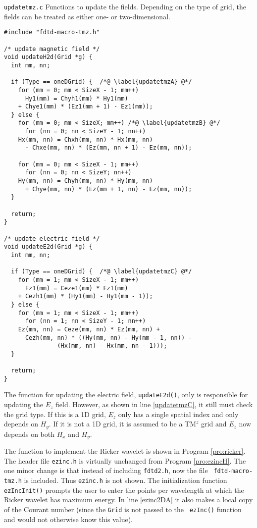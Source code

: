\begin{program}
{\tt updatetmz.c} Functions to update the fields.  Depending on the
type of grid, the fields can be treated as either one- or
two-dimensional.  
\label{pro:updatetmz}
\codemiddle
\begin{lstlisting}
#include "fdtd-macro-tmz.h"

/* update magnetic field */
void updateH2d(Grid *g) {
  int mm, nn;

  if (Type == oneDGrid) {  /*@ \label{updatetmzA} @*/
    for (mm = 0; mm < SizeX - 1; mm++)
      Hy1(mm) = Chyh1(mm) * Hy1(mm) 
	+ Chye1(mm) * (Ez1(mm + 1) - Ez1(mm));
  } else { 
    for (mm = 0; mm < SizeX; mm++) /*@ \label{updatetmzB} @*/
      for (nn = 0; nn < SizeY - 1; nn++)
	Hx(mm, nn) = Chxh(mm, nn) * Hx(mm, nn) 
	  - Chxe(mm, nn) * (Ez(mm, nn + 1) - Ez(mm, nn));

    for (mm = 0; mm < SizeX - 1; mm++)
      for (nn = 0; nn < SizeY; nn++)
	Hy(mm, nn) = Chyh(mm, nn) * Hy(mm, nn) 
	  + Chye(mm, nn) * (Ez(mm + 1, nn) - Ez(mm, nn));
  }

  return;
}

/* update electric field */
void updateE2d(Grid *g) {
  int mm, nn;

  if (Type == oneDGrid) {  /*@ \label{updatetmzC} @*/
    for (mm = 1; mm < SizeX - 1; mm++)
      Ez1(mm) = Ceze1(mm) * Ez1(mm) 
	+ Cezh1(mm) * (Hy1(mm) - Hy1(mm - 1));
  } else { 
    for (mm = 1; mm < SizeX - 1; mm++)
      for (nn = 1; nn < SizeY - 1; nn++)
	Ez(mm, nn) = Ceze(mm, nn) * Ez(mm, nn) +
	  Cezh(mm, nn) * ((Hy(mm, nn) - Hy(mm - 1, nn)) -
		       (Hx(mm, nn) - Hx(mm, nn - 1)));
  }

  return;
}
\end{lstlisting}
\end{program}

The function for updating the electric field, {\tt updateE2d()}, only
is responsible for updating the $E_z$ field.  However, as shown in
line \ref{updatetmzC}, it still must check the grid type.  If this is
a 1D grid, $E_z$ only has a single spatial index and only depends on
$H_y$.  If it is not a 1D grid, it is assumed to be a TM$^z$ grid and
$E_z$ now depends on both $H_x$ and $H_y$.

The function to implement the Ricker wavelet is shown in Program
\ref{pro:ricker}.  The header file {\tt ezinc.h} is virtually
unchanged from Program \ref{pro:ezincH}.  The one minor change is that
instead of including {\tt fdtd2.h}, now the file {\tt
  fdtd-macro-tmz.h} is included.  Thus {\tt ezinc.h} is not shown.
The initialization function {\tt ezIncInit()} prompts the user to
enter the points per wavelength at which the Ricker wavelet has
maximum energy.  In line \ref{ezinc2DA} it also makes a local copy of
the Courant number (since the {\tt Grid} is not passed to the {\tt
  ezInc()} function and would not otherwise know this value).

